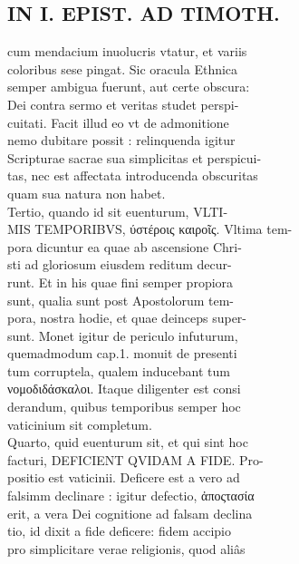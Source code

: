 \documentclass{article}
\begin{document}
\begin{pages}
\section*{IN I. EPIST. AD TIMOTH. \\
                }
cum mendacium inuolucris vtatur, et variis \\
                coloribus sese pingat. Sic oracula Ethnica \\
                semper ambigua fuerunt, aut certe obscura: \\
                Dei contra sermo et veritas studet perspi- \\
                cuitati. Facit illud eo vt de admonitione \\
                nemo dubitare possit : relinquenda igitur \\
                Scripturae sacrae sua simplicitas et perspicui- \\
                tas, nec est affectata introducenda obscuritas \\
                quam sua natura non habet. \\
                Tertio, quando id sit euenturum, VLTI- \\
                MIS TEMPORIBVS, ύστέροις καιροῖς. Vltima tem- \\
                pora dicuntur ea quae ab ascensione Chri- \\
                sti ad gloriosum eiusdem reditum decur- \\
                runt. Et in his quae fini semper propiora \\
                sunt, qualia sunt post Apostolorum tem- \\
                pora, nostra hodie, et quae deinceps super- \\
                sunt. Monet igitur de periculo infuturum, \\
                quemadmodum cap.1. monuit de presenti \\
                tum corruptela, qualem inducebant tum \\
                νομοδιδάσκαλοι. Itaque diligenter est consi \\
                derandum, quibus temporibus semper hoc \\
                vaticinium sit completum. \\
                Quarto, quid euenturum sit, et qui sint hoc \\
                facturi, DEFICIENT QVIDAM A FIDE. Pro- \\
                positio est vaticinii. Deficere est a vero ad \\
                falsimm declinare : igitur defectio, ἀποςτασία \\
                erit, a vera Dei cognitione ad falsam declina \\
                tio, id dixit a fide deficere: fidem accipio \\
                pro simplicitare verae religionis, quod aliâs \\
                

\end{pages}
\end{document}

